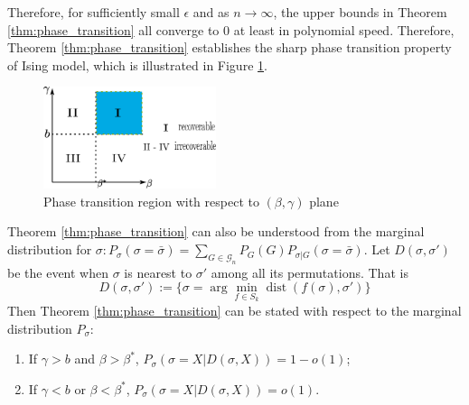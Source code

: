 \documentclass[entropy,article,submit,moreauthors,pdftex]{Definitions/mdpi}
\newcommand{\cG}{\mathcal{G}}
\newcommand{\1}{\mathbbm{1}}
\DeclareMathOperator{\Dist}{dist}
\begin{document}
Therefore, for sufficiently small $\epsilon$ and as $n \to \infty$, the upper bounds in Theorem \ref{thm:phase_transition} all converge to $0$ at least
in polynomial speed.
Therefore, Theorem \ref{thm:phase_transition} establishes the sharp phase transition property of Ising model, which is illustrated
in Figure \ref{fig:pt}.
\begin{figure}
	\centering
	\includegraphics[width=0.45\textwidth]{phase_trans.eps}
	\caption{Phase transition region with respect to $(\beta, \gamma)$ plane}\label{fig:pt}
\end{figure}

Theorem
\ref{thm:phase_transition} can also be understood from the marginal distribution for $\sigma: P_{\sigma}(\sigma =\bar{\sigma})
=\sum_{G \in \cG_n}P_G(G)P_{\sigma |G}(\sigma=\bar{\sigma})$.
Let $D(\sigma, \sigma')$ be the event when $\sigma$ is nearest to $\sigma'$ among all its permutations.
That is
\begin{equation}
D(\sigma, \sigma') := \{ \sigma = \arg\min_{f \in S_k} \Dist(f(\sigma), \sigma')  \}
\end{equation}
Then Theorem \ref{thm:phase_transition} can be stated with respect to the marginal distribution $P_{\sigma}$:
\begin{Corollary}\label{cor:phase4}
\begin{enumerate}
	\item If $\gamma > b$ and $\beta > \beta^*$, $P_{\sigma}(\sigma = X | D(\sigma, X))  = 1-o(1)$;
	\item If $\gamma < b$ or $\beta < \beta^*$, $P_{\sigma}(\sigma = X | D(\sigma, X))  = o(1)$.
\end{enumerate}
\end{Corollary}
\end{document}

